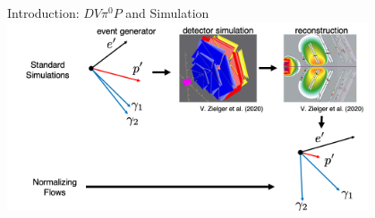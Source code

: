 \documentclass[aspectratio=169]{beamer}
\begin{document}
\begin{frame}{Introduction: $DV\pi^0P$ and Simulation}
    \centering
    \includegraphics[width = 0.8\textwidth]{images/Detectors/simulation.png}
    

\end{frame}
\end{document}
